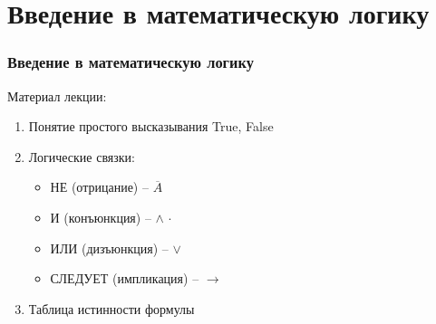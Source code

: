 \documentclass[10pt]{beamer}
\theoremstyle{remark}
\theoremstyle{definition}
\begin{document}
\section{Введение в математическую логику}
\begin{frame}[allowframebreaks]
\frametitle{Введение в математическую логику}

Материал лекции: 
\begin{enumerate}
    \item Понятие простого высказывания True, False
    \item Логические связки:
\begin{itemize}
    \item НЕ  (отрицание) -- $\overline{A}$
    \item И (конъюнкция) -- $\wedge$ $\cdot$
    \item ИЛИ (дизъюнкция) -- $\vee$
    \item СЛЕДУЕТ (импликация) -- $\to$
\end{itemize}
\item Таблица истинности формулы
\end{enumerate}

\end{frame}
\end{document}
